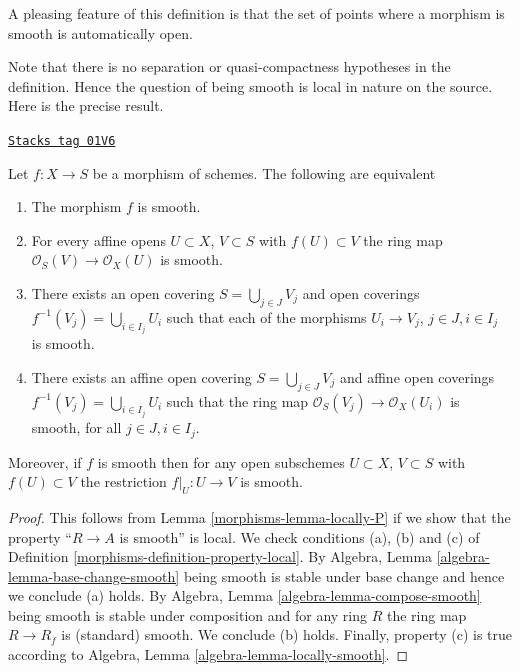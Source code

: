 A pleasing feature of this definition is that the set of points
where a morphism is smooth is automatically open.

\medskip\noindent
Note that there is no separation or quasi-compactness hypotheses in the
definition. Hence the question of being smooth is local in nature on
the source. Here is the precise result.

\begin{lemma}
\label{morphisms-lemma-smooth-characterize}
\href{https://stacks.math.columbia.edu/tag/01V6}{\texttt{Stacks tag 01V6}}

Let $f : X \to S$ be a morphism of schemes.
The following are equivalent
\begin{enumerate}
\item The morphism $f$ is smooth.
\item For every affine opens $U \subset X$, $V \subset S$
with $f(U) \subset V$ the ring map
$\mathcal{O}_S(V) \to \mathcal{O}_X(U)$ is smooth.
\item There exists an open covering $S = \bigcup_{j \in J} V_j$
and open coverings $f^{-1}(V_j) = \bigcup_{i \in I_j} U_i$ such
that each of the morphisms $U_i \to V_j$, $j\in J, i\in I_j$
is smooth.
\item There exists an affine open covering $S = \bigcup_{j \in J} V_j$
and affine open coverings $f^{-1}(V_j) = \bigcup_{i \in I_j} U_i$ such
that the ring map $\mathcal{O}_S(V_j) \to \mathcal{O}_X(U_i)$ is
smooth, for all $j\in J, i\in I_j$.
\end{enumerate}
Moreover, if $f$ is smooth then for
any open subschemes $U \subset X$, $V \subset S$ with $f(U) \subset V$
the restriction $f|_U : U \to V$ is smooth.
\end{lemma}

\begin{proof}

This follows from Lemma \ref{morphisms-lemma-locally-P} if we show that
the property ``$R \to A$ is smooth'' is local.
We check conditions (a), (b) and (c) of Definition
\ref{morphisms-definition-property-local}.
By Algebra, Lemma \ref{algebra-lemma-base-change-smooth}
being smooth is stable under base change and hence
we conclude (a) holds. By
Algebra, Lemma \ref{algebra-lemma-compose-smooth}
being smooth is stable under composition and for any ring
$R$ the ring map $R \to R_f$ is (standard) smooth.
We conclude (b) holds. Finally, property (c) is true
according to Algebra, Lemma \ref{algebra-lemma-locally-smooth}.
\end{proof}

